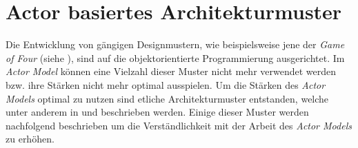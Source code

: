 \section{Actor basiertes Architekturmuster}\label{sec:theory:actorArchitecture}
Die Entwicklung von gängigen Designmustern, wie beispielsweise jene der \textit{Game of Four} (siehe \cite{gangOfFour1995design}), sind auf die objektorientierte Programmierung ausgerichtet. Im \textit{Actor Model} können eine Vielzahl dieser Muster nicht mehr verwendet werden bzw. ihre Stärken nicht mehr optimal ausspielen. Um die Stärken des \textit{Actor Models} optimal zu nutzen sind etliche Architekturmuster entstanden, welche unter anderem in \cite{Vernon2015ReactiveAkka} und \cite{kuhn2017reactive} beschrieben werden. Einige dieser Muster werden nachfolgend beschrieben um die Verständlichkeit mit der Arbeit des \textit{Actor Models} zu erhöhen.

